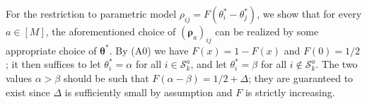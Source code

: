 \documentclass[letterpaper,12pt]{article}
\numberwithin{equation}{section}
\theoremstyle{plain}
\numberwithin{Theorem}{section}
\numberwithin{corollary}{section}
\numberwithin{proposition}{section}
\numberwithin{Lemma}{section}
{
	\theoremstyle{definition}
	\newtheorem{Definition}{Definition}
	\newtheorem{example}{Example}
	\numberwithin{example}{section}
	\newtheorem{fact}{Fact}
	\numberwithin{fact}{section}
	\newtheorem{remark}{Remark}
}
\newcommand{\1}{\mathbbm{1}}
\def\bth{{\boldsymbol{\theta}}}
\def\spacingset#1{\renewcommand{\baselinestretch}%
	{#1}\small\normalsize} \spacingset{1}
\begin{document}
For the restriction to parametric model $\rho_{ij} = F(\theta^*_i - \theta^*_j)$, we show that for every $a \in [M]$, the aforementioned choice of $\left(\bm \rho_a\right)_{ij}$ can be realized by some appropriate choice of $\bth^*$. By (A0) we have $F(x) = 1-F(x)$ and $F(0) = 1/2$; it then suffices to let $\theta^*_i = \alpha$ for all $i \in \mathcal S^a_k$, and let $\theta^*_i = \beta$ for all $i \not \in \mathcal S^a_k$. The two values $\alpha > \beta$ should be such that $F(\alpha - \beta) = 1/2 + \Delta$; they are guaranteed to exist since $\Delta$ is sufficiently small by assumption and $F$ is strictly increasing.

\spacingset{1.6} 

	\label{lastpage}
\end{document}
